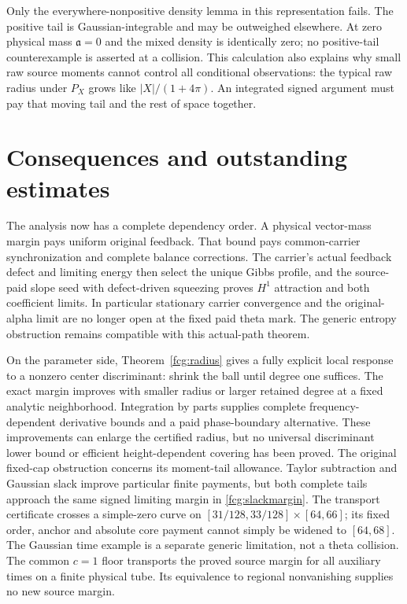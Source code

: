 \documentclass[11pt]{article}
\numberwithin{equation}{section}
\begin{document}
Only the everywhere-nonpositive density lemma in this representation
fails. The positive tail is Gaussian-integrable and may be outweighed
elsewhere. At zero physical mass $\mathfrak a=0$ and the mixed density
is identically zero; no positive-tail counterexample is asserted at
a collision. This calculation also explains why small raw source
moments cannot control all conditional observations: the typical raw
radius under $P_X$ grows like $|X|/(1+4\pi)$. An integrated signed
argument must pay that moving tail and the rest of space together.

\section{Consequences and outstanding estimates}\label{sec:remaining}

The analysis now has a complete dependency order. A physical vector-mass
margin pays uniform original feedback. That bound pays common-carrier
synchronization and complete balance corrections. The carrier's actual
feedback defect and limiting energy then select the unique Gibbs profile,
and the source-paid slope seed with defect-driven squeezing proves
$H^1$ attraction and both coefficient limits. In particular stationary
carrier convergence and the original-alpha limit are no longer open at
the fixed paid theta mark. The generic entropy obstruction remains
compatible with this actual-path theorem.

On the parameter side, Theorem~\ref{fcg:radius} gives a fully
explicit local response to a nonzero center discriminant: shrink the
ball until degree one suffices. The exact margin improves with smaller
radius or larger retained degree at a fixed analytic neighborhood.
Integration by parts supplies complete frequency-dependent derivative
bounds and a paid phase-boundary alternative. These improvements can
enlarge the certified radius, but no universal discriminant lower
bound or efficient height-dependent covering has been proved.
The original fixed-cap obstruction concerns its moment-tail allowance.
Taylor subtraction and Gaussian slack improve particular finite
payments, but both complete tails approach the same signed limiting
margin in \eqref{fcg:slackmargin}. The transport certificate crosses a
simple-zero curve on $[31/128,33/128]\times[64,66]$; its fixed order,
anchor and absolute core payment cannot simply be widened to $[64,68]$.
The Gaussian time example is a separate generic limitation, not a
theta collision. The common $c=1$ floor transports the proved source
margin for all auxiliary times on a finite physical tube. Its
equivalence to regional nonvanishing supplies no new source margin.
\end{document}
